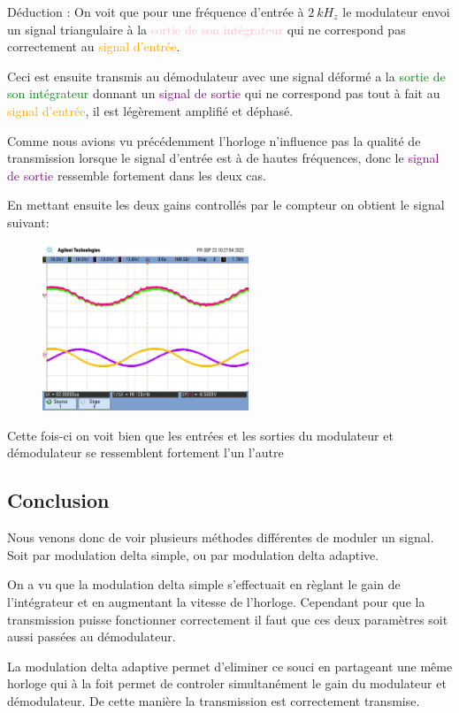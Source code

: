 \documentclass[11pt, openright]{book}
\begin{document}
\begin{dent}{Déduction :} On voit que pour une fréquence d'entrée à $2\ kH_z$ le modulateur envoi un signal triangulaire à la \textcolor{pink}{sortie de son intégrateur} qui ne correspond pas correctement au \textcolor{orange}{signal d'entrée}.

    Ceci est ensuite transmis au démodulateur avec une signal déformé a la \textcolor{green}{sortie de son intégrateur} donnant un \textcolor{purple}{signal de sortie} qui ne correspond pas tout à fait au \textcolor{orange}{signal d'entrée}, il est légèrement amplifié et déphasé.

    Comme nous avions vu précédemment l'horloge n'influence pas la qualité de transmission lorsque le signal d'entrée est à de hautes fréquences, donc le \textcolor{purple}{signal de sortie} ressemble fortement dans les deux cas.
\end{dent}

En mettant ensuite les deux gains controllés par le compteur on obtient le signal suivant:

\begin{figure}[ht]
    \centering
    \includegraphics[width=0.55\textwidth]{./object/g18.png}
\end{figure}

Cette fois-ci on voit bien que les entrées et les sorties du modulateur et démodulateur se ressemblent fortement l'un l'autre

\subsection{Conclusion}

Nous venons donc de voir plusieurs méthodes différentes de moduler un signal. Soit par modulation delta simple, ou par modulation delta adaptive.

On a vu que la modulation delta simple s'effectuait en règlant le gain de l'intégrateur et en augmentant la vitesse de l'horloge. Cependant pour que la transmission puisse fonctionner correctement il faut que ces deux paramètres soit aussi passées au démodulateur.

La modulation delta adaptive permet d'eliminer ce souci en partageant une même horloge qui à la foit permet de controler simultanément le gain du modulateur et démodulateur. De cette manière la transmission est correctement transmise.
\end{document}
